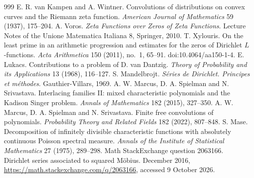 \begin{thebibliography}{999}
 E. R. van Kampen and A. Wintner. Convolutions of distributions on convex curves and the Riemann zeta function. \emph{American Journal of Mathematics} 59 (1937), 175--204.
 A. Voros. \emph{Zeta Functions over Zeros of Zeta Functions}. Lecture Notes of the Unione Matematica Italiana 8, Springer, 2010.
 T. Xylouris. On the least prime in an arithmetic progression and estimates for the zeros of Dirichlet $L$-functions. \emph{Acta Arithmetica} 150 (2011), no.~1, 65--91. doi:10.4064/aa150-1-4. %
 E. Lukacs. Contributions to a problem of D. van Dantzig. \emph{Theory of Probability and its Applications} 13 (1968), 116--127.
 S. Mandelbrojt. \emph{S\'eries de Dirichlet. Principes et m\'ethodes}. Gauthier-Villars, 1969.
 A. W. Marcus, D. A. Spielman and N. Srivastava. Interlacing families II: mixed characteristic polynomials and the Kadison Singer problem. \emph{Annals of Mathematics} 182 (2015), 327--350.
 A. W. Marcus, D. A. Spielman and N. Srivastava. Finite free convolutions of polynomials. \emph{Probability Theory and Related Fields} 182 (2022), 807--848.
 S. Mase. Decomposition of infinitely divisible characteristic functions with absolutely continuous Poisson spectral measure. \emph{Annals of the Institute of Statistical Mathematics} 27 (1975), 289--298.
 Math StackExchange question 2063166. Dirichlet series associated to squared M\"obius. December 2016, \url{https://math.stackexchange.com/q/2063166}, accessed 9 October 2026.

\end{thebibliography}
